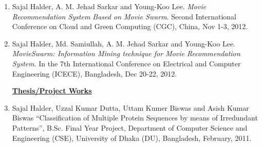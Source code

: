\begin{enumerate}
%
\item Sajal Halder, A. M. Jehad Sarkar and Young-Koo Lee. \textit{Movie Recommendation System Based on Movie Swarm}. Second International Conference on Cloud and Green Computing (CGC), China, Nov 1-3, 2012.
\item Sajal Halder, Md. Samiullah, A. M. Jehad Sarkar and Young-Koo Lee. \textit{MovieSwarm: Information Mining technique for Movie Recommendation System}. In the 7th International Conference on Electrical and Computer Engineering (ICECE), Bangladesh, Dec 20-22, 2012.


\begin{center}
\textbf{\Large \underline{Thesis/Project Works}} 
\end{center}

\item Sajal Halder, Uzzal Kumar Dutta, Uttam Kumer Biswas and Asish Kumar Biswas ``Classification of Multiple Protein Sequences by means of Irredundant Patterns'', B.Sc. Final Year Project, Department of Computer Science and Engineering (CSE), University of Dhaka (DU), Bangladesh, February, 2011.
%
%
\end{enumerate}
%
